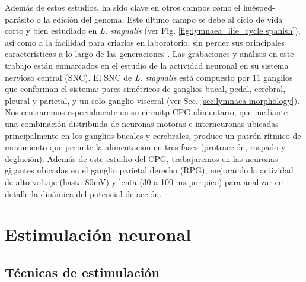 Además de estos estudios, ha sido clave en otros campos como el huésped-parásito o la edición del genoma. Este último campo se debe al ciclo de vida corto y bien estudiado en \textit{L. stagnalis} (ver Fig. \ref{fig:lymnaea_life_cycle spanish}), así como a la facilidad para criarlos en laboratorio, sin perder sus principales características a lo largo de las generaciones \parencite{noland_observations_1946}. Las grabaciones y análisis en este trabajo están enmarcados en el estudio de la actividad neuronal en su sistema nervioso central (SNC). El SNC de \textit{L. stagnalis} está compuesto por 11 ganglios que conforman el sistema: pares simétricos de ganglios bucal, pedal, cerebral, pleural y parietal, y un solo ganglio visceral (ver Sec. \ref{sec:lymnaea morphology}). Nos centraremos especialmente en su circuitp CPG alimentario, que mediante una combinación distribuida de neuronas motoras e interneuronas ubicadas principalmente en los ganglios bucales y cerebrales, produce un patrón rítmico de movimiento que permite la alimentación en tres fases (protracción, raspado y deglución). Además de este estudio del CPG, trabajaremos en las neuronas gigantes ubicadas en el ganglio parietal derecho (RPG), mejorando la actividad de alto voltaje (hasta 80mV) y lenta (30 a 100 ms por pico) para analizar en detalle la dinámica del potencial de acción.

\section{Estimulación neuronal}
\subsection{Técnicas de estimulación}

